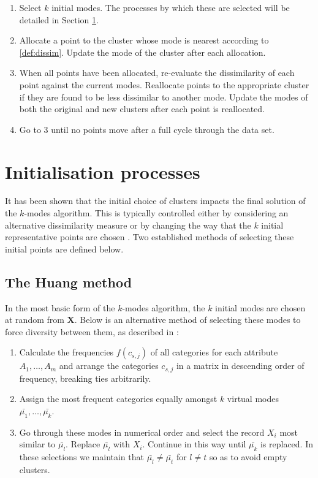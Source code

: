 \documentclass{article}
\theoremstyle{definition}
\begin{document}
\begin{enumerate}
	\item Select $k$ initial modes. The processes by which these are selected will be detailed in Section \ref*{section:init}.

	\item Allocate a point to the cluster whose mode is nearest according to \ref*{def:dissim}. Update the mode of the cluster after each allocation.
	
	\item When all points have been allocated, re-evaluate the dissimilarity of each point against the current modes. Reallocate points to the appropriate cluster if they are found to be less dissimilar to another mode. Update the modes of both the original and new clusters after each point is reallocated.
	
	\item Go to 3 until no points move after a full cycle through the data set.
\end{enumerate}



\section{Initialisation processes}\label{section:init}

It has been shown that the initial choice of clusters impacts the final solution of the $k$-modes algorithm. This is typically controlled either by considering an alternative dissimilarity measure  \cite{Ng07} or by changing the way that the $k$ initial representative points are chosen \cite{Huang98} \cite{Cao09}. Two established methods of selecting these initial points are defined below. \\


\subsection{The Huang method}\label{subsection:huang}

In the most basic form of the $k$-modes algorithm, the $k$ initial modes are chosen at random from $\textbf{X}$. Below is an alternative method of selecting these modes to force diversity between them, as described in \cite{Huang98}:

\begin{enumerate}	
	\item Calculate the frequencies $f(c_{s, j})$ of all categories for each attribute $A_1, \ldots, A_m$ and arrange the categories $c_{s, j}$ in a matrix in descending order of frequency, breaking ties arbitrarily.
	
	\item Assign the most frequent categories equally amongst $k$ virtual modes $\bar{\mu_1}, \ldots, \bar{\mu_k}$.
	
	\item Go through these modes in numerical order and select the record $X_i$ most similar to $\bar{\mu_l}$. Replace $\bar{\mu_l}$ with $X_i$. Continue in this way until $\bar{\mu_k}$ is replaced. In these selections we maintain that $\bar{\mu_l} \ne \bar{\mu_t}$ for $l \ne t$ so as to avoid empty clusters.
\end{enumerate}
\end{document}
